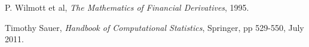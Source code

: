\documentclass[8 pt]{article}
\begin{document}
\begin{thebibliography}{28}
\raggedright
{}

 P. Wilmott et al, \emph{The Mathematics of Financial Derivatives}, 1995.

 Timothy Sauer, \emph{Handbook of Computational Statistics}, Springer, pp 529-550, July 2011.

\end{thebibliography}
\end{document}
